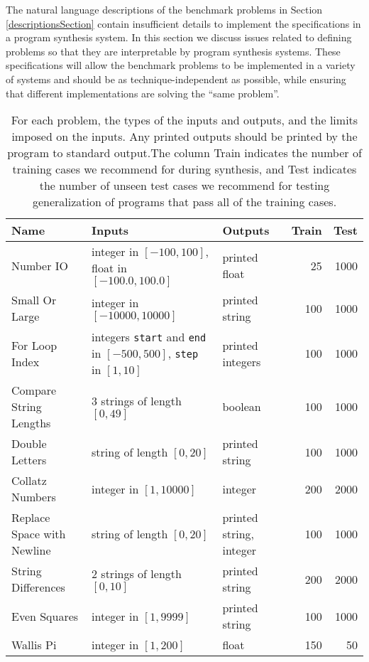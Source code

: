 \documentclass{sig-alternate}
\begin{document}
The natural language descriptions of the benchmark problems in Section \ref{descriptionsSection} contain insufficient details to implement the specifications in a program synthesis system. In this section we discuss issues related to defining problems so that they are interpretable by program synthesis systems. These specifications will allow the benchmark problems to be implemented in a variety of systems and should be as technique-independent as possible, while ensuring that different implementations are solving the ``same problem''.

\begin{table*}[t]
\centering
\caption{For each problem, the types of the inputs and outputs, and the limits imposed on the inputs. Any printed outputs should be printed by the program to standard output.The column Train indicates the number of training cases we recommend for during synthesis, and Test indicates the number of unseen test cases we recommend for testing generalization of programs that pass all of the training cases.}
\label{testCasesTable}
\begin{tabular}{|l | >{\raggedright}p{7.4cm} l rr|}
\hline
\textbf{Name} & \textbf{Inputs} & \textbf{Outputs} & \textbf{Train} & \textbf{Test} \\
\hline
\hline
Number IO & integer in $[-100, 100]$, float in $[-100.0, 100.0]$ & printed float & 25 & 1000 \\
\hline
Small Or Large & integer in $[-10000, 10000]$ & printed string & 100 & 1000 \\
\hline
For Loop Index & integers \texttt{start} and \texttt{end} in $[-500, 500]$, \texttt{step} in $[1, 10]$ & printed integers & 100 & 1000 \\
\hline
Compare String Lengths & 3 strings of length $[0, 49]$ & boolean & 100 & 1000 \\
\hline
Double Letters & string of length $[0, 20]$ & printed string & 100 & 1000 \\
\hline
Collatz Numbers & integer in $[1, 10000]$ & integer & 200 & 2000 \\
\hline
Replace Space with Newline & string of length $[0, 20]$ & printed string, integer & 100 & 1000 \\
\hline
String Differences & 2 strings of length $[0, 10]$ & printed string & 200 & 2000 \\
\hline
Even Squares & integer in $[1, 9999]$ & printed string & 100 & 1000 \\
\hline
Wallis Pi & integer in $[1, 200]$ & float & 150 & 50 \\

\end{tabular}
\end{table*}
\end{document}
